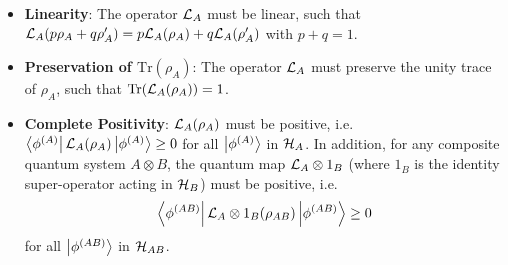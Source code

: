 \begin{itemize}
\item \textbf{Linearity}: The operator $\LA{A}$ must be linear, such that \mbox{$\LA{A}(p\rho_A+q\rho'_A)=p\LA{A}(\rho_A)+q\LA{A}(\rho'_A)$} with $p+q=1$. 
\item \textbf{Preservation of $\mathrm{Tr}(\rho_A)$}: The operator $\LA{A}$ must preserve the unity trace of $\rho_A$, such that $\mathrm{Tr}(\LA{A}(\rho_A))=1$.
\item \textbf{Complete Positivity}: $\LA{A}(\rho_A)$ must be positive, i.e. $\bra{\phi^{(A)}}\LA{A}(\rho_A)\ket{\phi^{(A)}}\ge 0$ for all $\left| \phi^{(A)} \right>$ in $\begin{mathcal}H\end{mathcal}_A$. In addition, for any composite quantum system $A\otimes B$, the quantum map $\LA{A}	\otimes \mathrm{1}_B$ (where $\mathrm{1}_B$ is the identity super-operator acting in $\begin{mathcal}H\end{mathcal}_B$) must be positive, i.e. $$\bra{\phi^{(AB)}}\LA{A}\otimes\mathrm{1}_B(\rho_{AB})\ket{\phi^{(AB)}}\ge 0$$ for all $\left| \phi^{(AB)} \right>$ in $\begin{mathcal}H\end{mathcal}_{AB}$.
\end{itemize}

